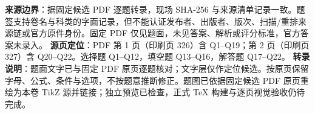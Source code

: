 

\begin{gktip}
\textbf{来源边界}：据固定候选 PDF 逐题转录，现场 SHA-256 与来源清单记录一致。题签支持卷名与科类的字面记录，但不能认证发布者、出版者、版次、扫描/重排来源链或官方原件身份。固定 PDF 仅见题面，未见答案、解析或评分标准，官方答案未录入。
\textbf{源页定位}：PDF 第 1 页（印刷页 326）含 Q1–Q19；第 2 页（印刷页 327）含 Q20–Q22。选择题 Q1–Q12，填空题 Q13–Q16，解答题 Q17–Q22。
\textbf{转录说明}：题面文字已与固定 PDF 原页逐题核对；文字层仅作定位候选。按原页保留字母、公式、条件与选项，不按题意推断修正。题图已依据固定候选 PDF 原页重绘为本卷 TikZ 源并链接；独立预览已检查，正式 TeX 构建与逐页视觉验收仍待完成。
\end{gktip}


